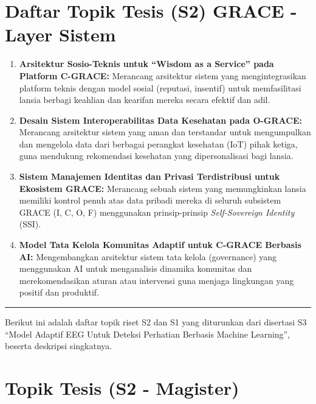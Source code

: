 \documentclass[
  letterpaper,
  DIV=11,
  numbers=noendperiod]{scrreprt}
\begin{document}
\section{\texorpdfstring{\textbf{Daftar Topik Tesis (S2) GRACE - Layer
Sistem}}{Daftar Topik Tesis (S2) GRACE - Layer Sistem}}\label{daftar-topik-tesis-s2-grace---layer-sistem}

\begin{enumerate}
\def\labelenumi{\arabic{enumi}.}
\item
  \textbf{Arsitektur Sosio-Teknis untuk ``Wisdom as a Service'' pada
  Platform C-GRACE:} Merancang arsitektur sistem yang mengintegrasikan
  platform teknis dengan model sosial (reputasi, insentif) untuk
  memfasilitasi lansia berbagi keahlian dan kearifan mereka secara
  efektif dan adil.
\item
  \textbf{Desain Sistem Interoperabilitas Data Kesehatan pada O-GRACE:}
  Merancang arsitektur sistem yang aman dan terstandar untuk
  mengumpulkan dan mengelola data dari berbagai perangkat kesehatan
  (IoT) pihak ketiga, guna mendukung rekomendasi kesehatan yang
  dipersonalisasi bagi lansia.
\item
  \textbf{Sistem Manajemen Identitas dan Privasi Terdistribusi untuk
  Ekosistem GRACE:} Merancang sebuah sistem yang memungkinkan lansia
  memiliki kontrol penuh atas data pribadi mereka di seluruh subsistem
  GRACE (I, C, O, F) menggunakan prinsip-prinsip \emph{Self-Sovereign
  Identity} (SSI).
\item
  \textbf{Model Tata Kelola Komunitas Adaptif untuk C-GRACE Berbasis
  AI:} Mengembangkan arsitektur sistem tata kelola (governance) yang
  menggunakan AI untuk menganalisis dinamika komunitas dan
  merekomendasikan aturan atau intervensi guna menjaga lingkungan yang
  positif dan produktif.
\end{enumerate}

\begin{center}\rule{0.5\linewidth}{0.5pt}\end{center}

Berikut ini adalah daftar topik riset S2 dan S1 yang diturunkan dari
disertasi S3 ``Model Adaptif EEG Untuk Deteksi Perhatian Berbasis
Machine Learning'', beserta deskripsi singkatnya.

\section{\texorpdfstring{\textbf{Topik Tesis (S2 -
Magister)}}{Topik Tesis (S2 - Magister)}}\label{topik-tesis-s2---magister}
\end{document}

